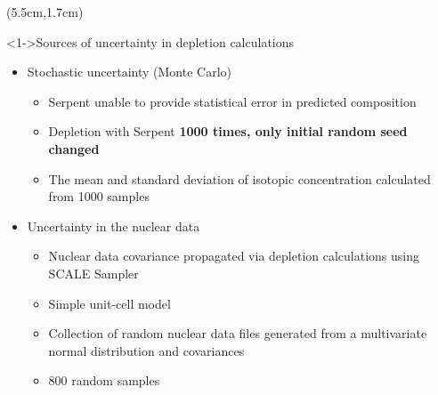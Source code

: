\begin{frame}
\begin{textblock*}{12.4cm}
\begin{columns}
		\column[t]{6cm}
		\begin{textblock*}{7.2cm}(5.5cm,1.7cm) %
			\begin{block}<1->{Sources of uncertainty in depletion calculations}
				\begin{itemize}
					\itemsep=0.3em
					\item<3> Stochastic uncertainty (Monte Carlo)
					\begin{itemize}
						\itemsep=0.5em
						\item Serpent unable to provide statistical error in 
						predicted composition
						\item Depletion with Serpent \textbf{1000 times, only 
							initial random seed changed}
						\item The mean and standard deviation of isotopic 
						concentration calculated from 1000 samples
					\end{itemize}
					
					\item<1-> Uncertainty in the nuclear data
					\begin{itemize}
						\itemsep=0.5em
						\item Nuclear data covariance propagated via 
						depletion calculations using SCALE Sampler
						\item Simple unit-cell model
						\item Collection of random nuclear data files 
						generated from a multivariate normal distribution and 
						covariances
						\item 800 random samples
					\end{itemize} 
				\end{itemize}
			\end{block}
				
		\end{textblock*}
		
	\end{columns}
\end{textblock*}
\end{frame}